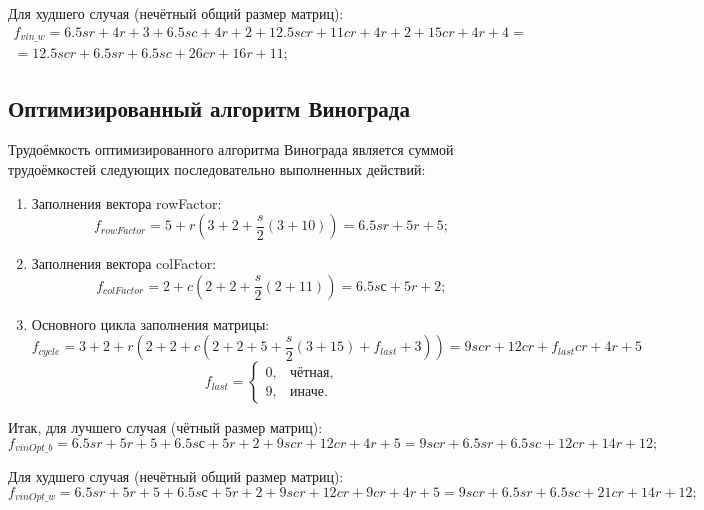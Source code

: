\documentclass[12pt]{report}
\begin{document}
Для худшего случая (нечётный общий размер матриц): 
\begin{eqnarray}
f_{vin\_w} = 6.5sr + 4r + 3 + 6.5sc + 4r + 2 + 12.5scr + 11cr + 4r + 2 + 15cr + 4r + 4 =\\ = 12.5scr + 6.5sr + 6.5sc + 26cr + 16r + 11;
\end{eqnarray}

\subsection{Оптимизированный алгоритм Винограда}

Трудоёмкость оптимизированного алгоритма Винограда является суммой трудоёмкостей следующих последовательно выполненных действий:
\begin{enumerate}
	\item Заполнения вектора rowFactor:
	\begin{equation}
	f_{rowFactor} = 5 + r(3 + 2 + \frac{s}{2}(3 + 10)) = 6.5sr + 5r + 5;
	\end{equation}
	
	\item Заполнения вектора colFactor:
	\begin{equation}
	f_{colFactor} = 2 + c(2 + 2 + \frac{s}{2}(2 + 11)) = 6.5sс + 5r + 2;
	\end{equation}
	
	\item Основного цикла заполнения матрицы:
	\begin{equation}
	f_{cycle} = 3 + 2 + r(2 + 2 + c(2 + 2 + 5 + \frac{s}{2}(3 + 15) + f_{last} + 3)) = 9scr + 12cr + f_{last}cr + 4r + 5
	\end{equation}
	\begin{equation}
	f_{last} = \begin{cases}
	0, & \text{чётная,}\\
	9, & \text{иначе.}
	\end{cases}
	\end{equation}
\end{enumerate}

Итак, для лучшего случая (чётный размер матриц): 
\begin{equation}
f_{vinOpt\_b} = 6.5sr + 5r + 5 + 6.5sс + 5r + 2 + 9scr + 12cr + 4r + 5 = 9scr + 6.5sr + 6.5sc + 12cr + 14r + 12;
\end{equation}

Для худшего случая (нечётный общий размер матриц): 
\begin{equation}
f_{vinOpt\_w} = 6.5sr + 5r + 5 + 6.5sс + 5r + 2 + 9scr + 12cr + 9cr + 4r + 5 = 9scr + 6.5sr + 6.5sc + 21cr + 14r + 12;
\end{equation}
\end{document}

